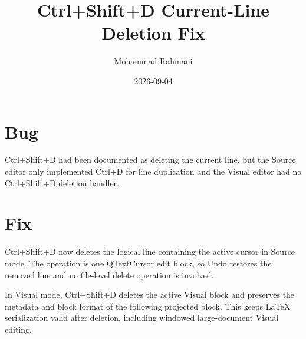 \documentclass[a4paper]{article}
\title{Ctrl+Shift+D Current-Line Deletion Fix}
\date{2026-09-04}
\author{Mohammad Rahmani}
\begin{document}
   \maketitle

   \section{Bug}
   Ctrl+Shift+D had been documented as deleting the current line, but the
   Source editor only implemented Ctrl+D for line duplication and the Visual
   editor had no Ctrl+Shift+D deletion handler.

   \section{Fix}
   Ctrl+Shift+D now deletes the logical line containing the active cursor in
   Source mode. The operation is one QTextCursor edit block, so Undo restores
   the removed line and no file-level delete operation is involved.

   In Visual mode, Ctrl+Shift+D deletes the active Visual block and preserves
   the metadata and block format of the following projected block. This keeps
   LaTeX serialization valid after deletion, including windowed large-document
   Visual editing.

   
   
\end{document}

